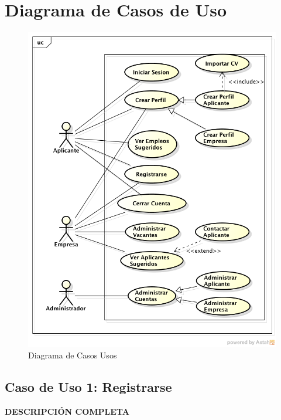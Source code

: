 \section{Diagrama de Casos de Uso}

\begin{figure}[h]
\begin{center}
	\includegraphics[scale=0.71]{./resources/UserCaseDiagram.png}
	\caption{Diagrama de Casos Usos}
	\label{fig:User: casediagram}
\end{center}
\end{figure}

\newpage


\subsection{Caso de Uso 1: Registrarse}
\textbf{DESCRIPCIÓN COMPLETA}
\newline 

